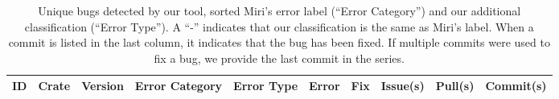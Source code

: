 \small
\begin{longtable}{|c|l|c|l|l|c|c|c|c|c|}
\caption{Unique bugs detected by our tool, sorted Miri's error label (``Error Category'') and our additional classification (``Error Type''). A ``-'' indicates that our classification is the same as Miri's label. When a commit is listed in the last column, it indicates that the bug has been fixed. If multiple commits were used to fix a bug, we provide the last commit in the series.}
\label{appendix:table:bugs}\\

\hline
{\textbf{ID}} & {\textbf{Crate}} & {\textbf{Version}} & {\textbf{Error Category}} & {\textbf{Error Type}} & {\textbf{Error}} & {\textbf{Fix}} & {\textbf{Issue(s)}} & {\textbf{Pull(s)}} & {\textbf{Commit(s)}} \\ 
\hline
\hline
\endfirsthead


\end{longtable}
